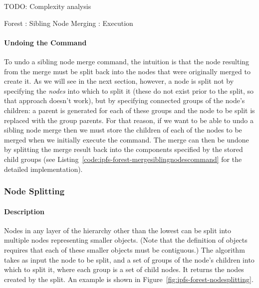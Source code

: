 TODO: Complexity analysis

\begin{stulisting}[p]
\caption{Forest : Sibling Node Merging : Execution}
\label{code:ipfs-forest-mergesiblingnodesimpl}

\end{stulisting}

\paragraph{Undoing the Command}

To undo a sibling node merge command, the intuition is that the node resulting from the merge must be split back into the nodes that were originally merged to create it. As we will see in the next section, however, a node is split not by specifying the \emph{nodes} into which to split it (these do not exist prior to the split, so that approach doesn't work), but by specifying connected groups of the node's children: a parent is generated for each of these groups and the node to be split is replaced with the group parents. For that reason, if we want to be able to undo a sibling node merge then we must store the children of each of the nodes to be merged when we initially execute the command. The merge can then be undone by splitting the merge result back into the components specified by the stored child groups (see Listing~\ref{code:ipfs-forest-mergesiblingnodescommand} for the detailed implementation).

\afterpage{\clearpage}
\newpage

\subsubsection{Node Splitting}

\paragraph{Description}

Nodes in any layer of the hierarchy other than the lowest can be split into multiple nodes representing smaller objects. (Note that the definition of objects requires that each of these smaller objects must be contiguous.) The algorithm takes as input the node to be split, and a set of groups of the node's children into which to split it, where each group is a set of child nodes. It returns the nodes created by the split. An example is shown in Figure~\ref{fig:ipfs-forest-nodesplitting}.

